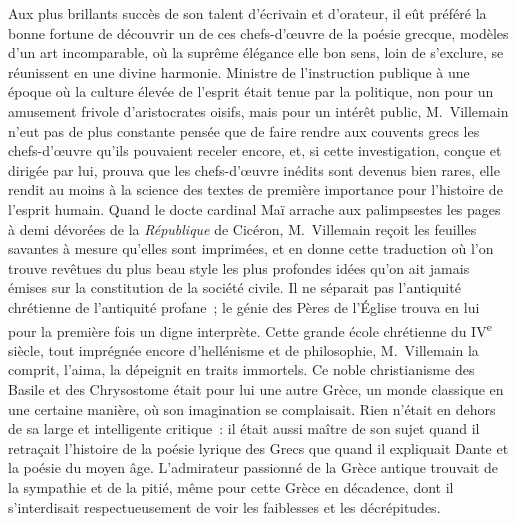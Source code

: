 \documentclass[french,twoside]{book} %
\newcommand\orgName[1]{#1}
\newcommand\persName[1]{#1}
\newcommand\placeName[1]{#1}
\begin{document}
Aux plus brillants succès de son talent d’écrivain et d’orateur, il eût préféré la bonne fortune de découvrir un de ces chefs-d’œuvre de la poésie grecque, modèles d’un art incomparable, où la suprême élégance elle bon sens, loin de s’exclure, se réunissent en une divine harmonie. Ministre de l’instruction publique à une époque où la culture élevée de l’esprit était tenue par la politique, non pour un amusement frivole d’aristocrates oisifs, mais pour un intérêt public, {\persName M. Villemain} n’eut pas de plus constante pensée que de faire rendre aux couvents grecs les chefs-d’œuvre qu’ils pouvaient receler encore, et, si cette investigation, conçue et dirigée par lui, prouva que les chefs-d’œuvre inédits sont devenus bien rares, elle rendit au moins à la science des textes de première importance pour l’histoire de l’esprit humain. Quand le docte {\persName cardinal Maï} arrache aux palimpsestes les pages à demi dévorées de la \emph{République} de {\persName Cicéron}, {\persName M. Villemain} reçoit les feuilles savantes à mesure qu’elles sont imprimées, et en donne cette traduction où l’on trouve revêtues du plus beau style les plus profondes idées qu’on ait jamais émises sur la constitution de la société civile. Il ne séparait pas l’antiquité chrétienne de l’antiquité profane ; le génie des Pères de l’{\orgName Église} trouva en lui pour la première fois un digne interprète. Cette grande école chrétienne du IV\textsuperscript{e} siècle, tout imprégnée encore d’hellénisme et de philosophie, {\persName M. Villemain} la comprit, l’aima, la dépeignit en traits immortels. Ce noble christianisme des {\persName Basile} et des {\persName Chrysostome} était pour lui une autre {\orgName Grèce}, un monde classique en une certaine manière, où son imagination se complaisait. Rien n’était en dehors de sa large et intelligente critique : il était aussi maître de son sujet quand il retraçait l’histoire de la poésie lyrique des {\orgName Grecs} que quand il expliquait {\persName Dante} et la poésie du moyen âge. L’admirateur passionné de la {\placeName Grèce antique} trouvait de la sympathie et de la pitié, même pour cette Grèce en décadence, dont il s’interdisait respectueusement de voir les faiblesses et les décrépitudes.\par
\end{document}
